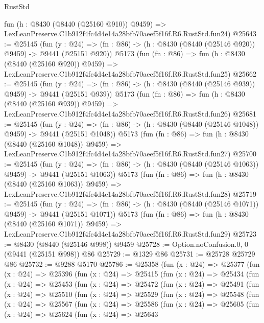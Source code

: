 \begin{lexlean}{RustStd}
\begin{coremodule}
    fun (h : @8430 (@8440 (@25160 @910)) @9459) =>
    LexLeanPreserve.C1b912f4fc4d4e14a28bfb70aeef5f16f.R6.RustStd.fun24)
@25643 := @25145
    (fun (y : @24) => (fn : @86) -> (h : @8430 (@8440 (@25146 @920)) @9459) -> @9441 (@25151 @920))
    @5173
    (fun (fn : @86) =>
    fun (h : @8430 (@8440 (@25160 @920)) @9459) =>
    LexLeanPreserve.C1b912f4fc4d4e14a28bfb70aeef5f16f.R6.RustStd.fun25)
@25662 := @25145
    (fun (y : @24) => (fn : @86) -> (h : @8430 (@8440 (@25146 @939)) @9459) -> @9441 (@25151 @939))
    @5173
    (fun (fn : @86) =>
    fun (h : @8430 (@8440 (@25160 @939)) @9459) =>
    LexLeanPreserve.C1b912f4fc4d4e14a28bfb70aeef5f16f.R6.RustStd.fun26)
@25681 := @25145
    (fun (y : @24) =>
    (fn : @86) -> (h : @8430 (@8440 (@25146 @1048)) @9459) -> @9441 (@25151 @1048))
    @5173
    (fun (fn : @86) =>
    fun (h : @8430 (@8440 (@25160 @1048)) @9459) =>
    LexLeanPreserve.C1b912f4fc4d4e14a28bfb70aeef5f16f.R6.RustStd.fun27)
@25700 := @25145
    (fun (y : @24) =>
    (fn : @86) -> (h : @8430 (@8440 (@25146 @1063)) @9459) -> @9441 (@25151 @1063))
    @5173
    (fun (fn : @86) =>
    fun (h : @8430 (@8440 (@25160 @1063)) @9459) =>
    LexLeanPreserve.C1b912f4fc4d4e14a28bfb70aeef5f16f.R6.RustStd.fun28)
@25719 := @25145
    (fun (y : @24) =>
    (fn : @86) -> (h : @8430 (@8440 (@25146 @1071)) @9459) -> @9441 (@25151 @1071))
    @5173
    (fun (fn : @86) =>
    fun (h : @8430 (@8440 (@25160 @1071)) @9459) =>
    LexLeanPreserve.C1b912f4fc4d4e14a28bfb70aeef5f16f.R6.RustStd.fun29)
@25723 := @8430 (@8440 (@25146 @998)) @9459
@25728 := Option.noConfusion.{0, 0} (@9441 (@25151 @998)) @86
@25729 := @1329 @86
@25731 := @25728 @25729 @86
@25732 := @9288 @5170
@25786 := @25358
    (fun (x : @24) =>
    @25377
      (fun (x : @24) =>
      @25396
        (fun (x : @24) =>
        @25415
          (fun (x : @24) =>
          @25434
            (fun (x : @24) =>
            @25453
              (fun (x : @24) =>
              @25472
                (fun (x : @24) =>
                @25491
                  (fun (x : @24) =>
                  @25510
                    (fun (x : @24) =>
                    @25529
                      (fun (x : @24) =>
                      @25548
                        (fun (x : @24) =>
                        @25567
                          (fun (x : @24) =>
                          @25586
                            (fun (x : @24) =>
                            @25605
                              (fun (x : @24) =>
                              @25624
                                (fun (x : @24) =>
                                @25643

\end{coremodule}
\end{lexlean}
